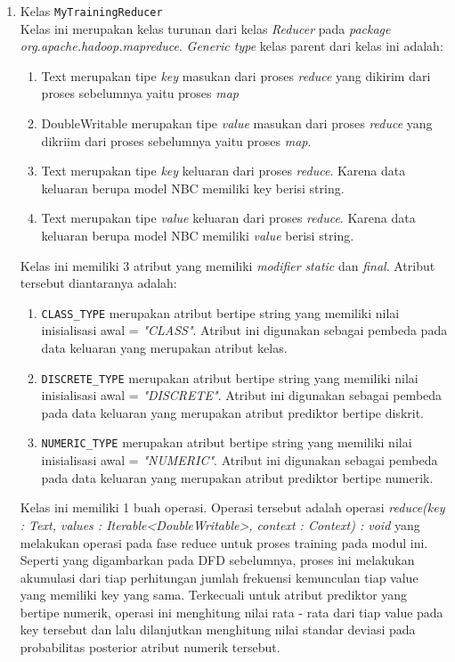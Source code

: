 \begin{enumerate}
	\item{Kelas \texttt{MyTrainingReducer}}\\
	Kelas ini merupakan kelas turunan dari kelas \textit{Reducer} pada \textit{package org.apache.hadoop.mapreduce}. \textit{Generic type} kelas parent dari kelas ini adalah: 
	\begin{enumerate}
		\item Text merupakan tipe \textit{key} masukan dari proses \textit{reduce} yang dikirim dari proses sebelumnya yaitu proses \textit{map}
		\item DoubleWritable merupakan tipe \textit{value} masukan dari proses \textit{reduce} yang dikriim dari proses sebelumnya yaitu proses \textit{map}.
		\item Text merupakan tipe \textit{key} keluaran dari proses \textit{reduce}. Karena data keluaran berupa model NBC memiliki key berisi string.
		\item Text merupakan tipe \textit{value} keluaran dari proses \textit{reduce}. Karena data keluaran berupa model NBC memiliki \textit{value} berisi string.
	\end{enumerate}
	Kelas ini memiliki 3 atribut yang memiliki \textit{modifier} \textit{static} dan \textit{final}. Atribut tersebut diantaranya adalah:
	\begin{enumerate}
		\item \verb|CLASS_TYPE| merupakan atribut bertipe string yang memiliki nilai inisialisasi awal = \textit{"CLASS"}. Atribut ini digunakan sebagai pembeda pada data keluaran yang merupakan atribut kelas.
				
		\item \verb|DISCRETE_TYPE| merupakan atribut bertipe string yang memiliki nilai inisialisasi awal = \textit{"DISCRETE"}. Atribut ini digunakan sebagai pembeda pada data keluaran yang merupakan atribut prediktor bertipe diskrit.

		\item \verb|NUMERIC_TYPE| merupakan atribut bertipe string yang memiliki nilai inisialisasi awal = \textit{"NUMERIC"}. Atribut ini digunakan sebagai pembeda pada data keluaran yang merupakan atribut prediktor bertipe numerik.
	\end{enumerate}
	
	Kelas ini memiliki 1 buah operasi. Operasi tersebut adalah operasi \textit{reduce(key : Text, values : Iterable<DoubleWritable>, context : Context) : void} yang melakukan operasi pada fase reduce untuk proses training pada modul ini. Seperti yang digambarkan pada DFD sebelumnya, proses ini melakukan akumulasi dari tiap perhitungan jumlah frekuensi kemunculan tiap value yang memiliki key yang sama. Terkecuali untuk atribut prediktor yang bertipe numerik, operasi ini menghitung nilai rata - rata dari tiap value pada key tersebut dan lalu dilanjutkan menghitung nilai standar deviasi pada probabilitas posterior atribut numerik tersebut.
	

\end{enumerate}
